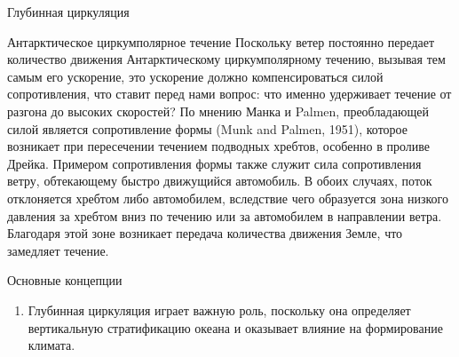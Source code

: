 \begin{chapter}{Глубинная циркуляция}
\begin{section}{Антарктическое циркумполярное течение}
Поскольку ветер постоянно передает количество движения Антарктическому
циркумполярному течению,
вызывая тем самым его ускорение, это ускорение должно компенсироваться
силой сопротивления, что ставит перед нами вопрос: что именно удерживает 
течение от разгона до высоких скоростей? По мнению Манка и Palmen, 
преобладающей силой является сопротивление формы 
(Munk and Palmen, 1951), которое возникает при пересечении течением
подводных хребтов, особенно в проливе Дрейка. Примером сопротивления формы также
служит сила сопротивления ветру, обтекающему быстро движущийся автомобиль.
В обоих случаях, поток отклоняется хребтом либо автомобилем, вследствие чего
образуется зона низкого давления за хребтом вниз по течению или за автомобилем
в направлении ветра. Благодаря этой зоне возникает передача количества 
движения Земле, что замедляет течение.
%
\end{section}

\begin{section}{Основные концепции}
\begin{enumerate}
\item
Глубинная циркуляция играет важную роль, поскольку она определяет вертикальную
стратификацию океана и оказывает влияние на формирование климата.
%


\end{enumerate}
\end{section}
\end{chapter}
